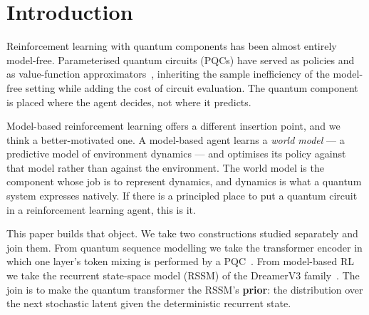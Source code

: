 \documentclass[11pt,onecolumn]{article}
\begin{document}
\begin{abstract}
Both circuits run on IonQ Forte-1, where measured parameter-shift
gradients agree with exact simulation. We also quantify a design
constraint that matters for any hardware implementation: at ten qubits
the two standard entangling topologies differ by a factor of
$2{,}766$ in the shot count needed to resolve a gradient. The
architecture is offered as an instrument for the question it makes
askable --- whether quantum dynamics models help when the dynamics are
themselves quantum --- and we release implementation, verification
harness and run records.
\end{abstract}

\vspace{1em}

\section{Introduction}
Reinforcement learning with quantum components has been almost entirely
model-free. Parameterised quantum circuits (PQCs) have served as
policies and as value-function approximators~\cite{chen2020,skolik2023},
inheriting the sample inefficiency of the model-free setting while
adding the cost of circuit evaluation. The quantum component is placed
where the agent decides, not where it predicts.

Model-based reinforcement learning offers a different insertion point,
and we think a better-motivated one. A model-based agent learns a
\emph{world model} --- a predictive model of environment dynamics ---
and optimises its policy against that model rather than against the
environment. The world model is the component whose job is to represent
dynamics, and dynamics is what a quantum system expresses natively. If
there is a principled place to put a quantum circuit in a reinforcement
learning agent, this is it.

This paper builds that object. We take two constructions studied
separately and join them. From quantum sequence modelling we take the
transformer encoder in which one layer's token mixing is performed by a
PQC~\cite{qasa}. From model-based RL we take the recurrent state-space
model (RSSM) of the DreamerV3 family~\cite{hafner2023}. The join is to
make the quantum transformer the RSSM's \textbf{prior}: the distribution
over the next stochastic latent given the deterministic recurrent state.
\end{document}
